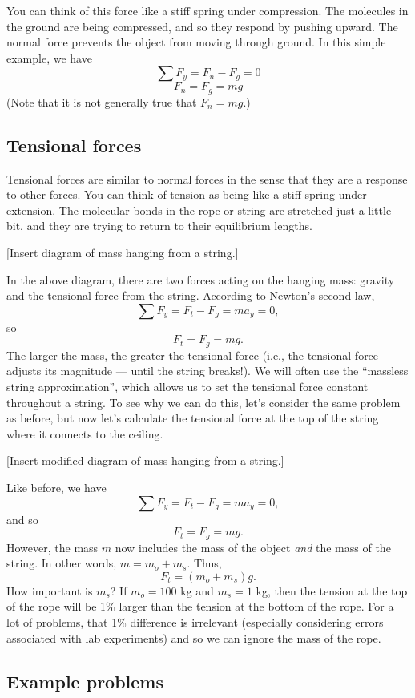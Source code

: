 You can think of this force like a stiff spring under compression. The molecules in the ground are being compressed, and so they respond by pushing upward. The normal force prevents the object from moving through ground. In this simple example, we have
$$\sum F_y=F_n-F_g=0$$
$$F_n=F_g=mg$$
(Note that it is not generally true that $F_n=mg$.)

\subsection{Tensional forces}
Tensional forces are similar to normal forces in the sense that they are a response to other forces. You can think of tension as being like a stiff spring under extension. The molecular bonds in the rope or string are stretched just a little bit, and they are trying to return to their equilibrium lengths.

[Insert diagram of mass hanging from a string.]
\vspace{5cm}

In the above diagram, there are two forces acting on the hanging mass: gravity and the tensional force from the string. According to Newton's second law, 
$$\sum F_y=F_t-F_g=ma_y=0,$$
so
$$F_t=F_g=mg.$$
The larger the mass, the greater the tensional force (i.e., the tensional force adjusts its magnitude --- until the string breaks!). We will often use the ``massless string approximation'', which allows us to set the tensional force constant throughout a string. To see why we can do this, let's consider 
the same problem as before, but now let's calculate the tensional force at the top of the string where it connects to the ceiling.

[Insert modified diagram of mass hanging from a string.]
\vspace{5cm}

Like before, we have
$$\sum F_y=F_t-F_g=ma_y=0,$$
and so
$$F_t=F_g=mg.$$
However, the mass $m$ now includes the mass of the object \textit{and} the mass of the string. In other words, $m=m_o+m_s$. Thus,
$$F_t=(m_o+m_s)g.$$
How important is $m_s$? If $m_o=100$ kg and $m_s=1$ kg, then the tension at the top of the rope will be 1\% larger than the tension at the bottom of the rope. For a lot of problems, that 1\% difference is irrelevant (especially considering errors associated with lab experiments) and so we can ignore the mass of the rope.

\subsection{Example problems}
